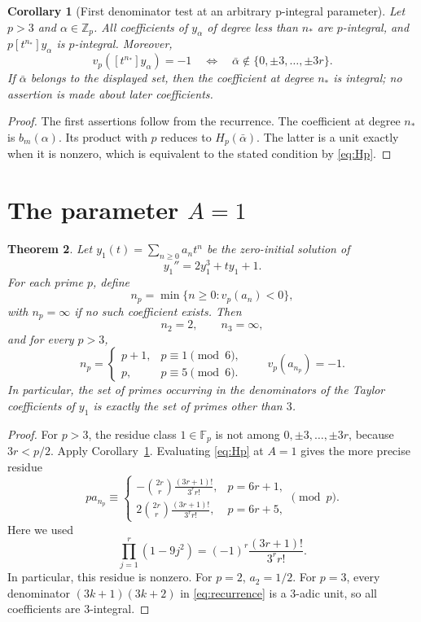 \documentclass[11pt,a4paper,reqno]{amsart}
\newtheorem{theorem}{Theorem}[section]
\newtheorem{corollary}[theorem]{Corollary}
\theoremstyle{definition}
\theoremstyle{remark}
\newcommand{\Z}{\mathbb Z}
\newcommand{\F}{\mathbb F}
\begin{document}
\begin{corollary}[First denominator test at an arbitrary p-integral parameter]\label{cor:first-test}
Let $p>3$ and $\alpha\in\Z_p$. All coefficients of $y_\alpha$ of degree less than $n_*$ are $p$-integral, and $p[t^{n_*}]y_\alpha$ is $p$-integral. Moreover,
\[
 v_p([t^{n_*}]y_\alpha)=-1
 \quad\Longleftrightarrow\quad
 \bar\alpha\notin\{0,\pm3,\ldots,\pm3r\}.
\]
If $\bar\alpha$ belongs to the displayed set, then the coefficient at degree $n_*$ is integral; no assertion is made about later coefficients.
\end{corollary}

\begin{proof}
The first assertions follow from the recurrence. The coefficient at degree $n_*$ is $b_m(\alpha)$. Its product with $p$ reduces to $H_p(\bar\alpha)$. The latter is a unit exactly when it is nonzero, which is equivalent to the stated condition by \eqref{eq:Hp}.
\end{proof}

\section{\texorpdfstring{The parameter $A=1$}{The parameter A=1}}

\begin{theorem}\label{thm:A1}
Let $y_1(t)=\sum_{n\ge0}a_n t^n$ be the zero-initial solution of
\[
 y_1''=2y_1^3+t y_1+1.
\]
For each prime $p$, define
\[
 n_p=\min\{n\ge0:v_p(a_n)<0\},
\]
with $n_p=\infty$ if no such coefficient exists. Then
\[
 n_2=2,\qquad n_3=\infty,
\]
and for every $p>3$,
\[
 n_p=
 \begin{cases}
 p+1,&p\equiv1\pmod6,\\
 p,&p\equiv5\pmod6.
 \end{cases}
 \qquad v_p(a_{n_p})=-1.
\]
In particular, the set of primes occurring in the denominators of the Taylor coefficients of $y_1$ is exactly the set of primes other than $3$.
\end{theorem}

\begin{proof}
For $p>3$, the residue class $1\in\F_p$ is not among $0,\pm3,\ldots,\pm3r$, because $3r<p/2$. Apply Corollary~\ref{cor:first-test}. Evaluating \eqref{eq:Hp} at $A=1$ gives the more precise residue
\[
 p a_{n_p}\equiv
 \begin{cases}
 -\displaystyle\binom{2r}{r}\frac{(3r+1)!}{3^r r!},&p=6r+1,\\[2mm]
 2\displaystyle\binom{2r}{r}\frac{(3r+1)!}{3^r r!},&p=6r+5,
 \end{cases}
 \pmod p.
\]
Here we used
\[
 \prod_{j=1}^{r}(1-9j^2)=(-1)^r\frac{(3r+1)!}{3^r r!}.
\]
In particular, this residue is nonzero. For $p=2$, $a_2=1/2$. For $p=3$, every denominator $(3k+1)(3k+2)$ in \eqref{eq:recurrence} is a $3$-adic unit, so all coefficients are $3$-integral.
\end{proof}
\end{document}
